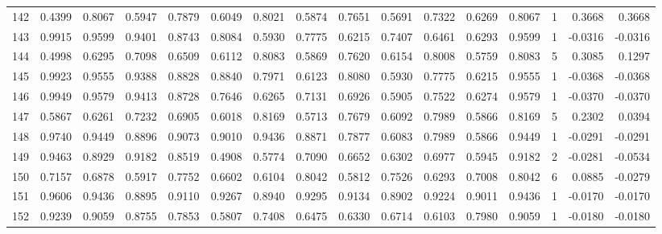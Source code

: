 \begin{tabular}{lrrrrrrrrrrrrrrr}
142 &      0.4399 &  0.8067 &  0.5947 &  0.7879 &  0.6049 &  0.8021 &  0.5874 &  0.7651 &  0.5691 &  0.7322 &   0.6269 &     0.8067 &      1 &                    0.3668 &                     0.3668 \\
143 &      0.9915 &  0.9599 &  0.9401 &  0.8743 &  0.8084 &  0.5930 &  0.7775 &  0.6215 &  0.7407 &  0.6461 &   0.6293 &     0.9599 &      1 &                   -0.0316 &                    -0.0316 \\
144 &      0.4998 &  0.6295 &  0.7098 &  0.6509 &  0.6112 &  0.8083 &  0.5869 &  0.7620 &  0.6154 &  0.8008 &   0.5759 &     0.8083 &      5 &                    0.3085 &                     0.1297 \\
145 &      0.9923 &  0.9555 &  0.9388 &  0.8828 &  0.8840 &  0.7971 &  0.6123 &  0.8080 &  0.5930 &  0.7775 &   0.6215 &     0.9555 &      1 &                   -0.0368 &                    -0.0368 \\
146 &      0.9949 &  0.9579 &  0.9413 &  0.8728 &  0.7646 &  0.6265 &  0.7131 &  0.6926 &  0.5905 &  0.7522 &   0.6274 &     0.9579 &      1 &                   -0.0370 &                    -0.0370 \\
147 &      0.5867 &  0.6261 &  0.7232 &  0.6905 &  0.6018 &  0.8169 &  0.5713 &  0.7679 &  0.6092 &  0.7989 &   0.5866 &     0.8169 &      5 &                    0.2302 &                     0.0394 \\
148 &      0.9740 &  0.9449 &  0.8896 &  0.9073 &  0.9010 &  0.9436 &  0.8871 &  0.7877 &  0.6083 &  0.7989 &   0.5866 &     0.9449 &      1 &                   -0.0291 &                    -0.0291 \\
149 &      0.9463 &  0.8929 &  0.9182 &  0.8519 &  0.4908 &  0.5774 &  0.7090 &  0.6652 &  0.6302 &  0.6977 &   0.5945 &     0.9182 &      2 &                   -0.0281 &                    -0.0534 \\
150 &      0.7157 &  0.6878 &  0.5917 &  0.7752 &  0.6602 &  0.6104 &  0.8042 &  0.5812 &  0.7526 &  0.6293 &   0.7008 &     0.8042 &      6 &                    0.0885 &                    -0.0279 \\
151 &      0.9606 &  0.9436 &  0.8895 &  0.9110 &  0.9267 &  0.8940 &  0.9295 &  0.9134 &  0.8902 &  0.9224 &   0.9011 &     0.9436 &      1 &                   -0.0170 &                    -0.0170 \\
152 &      0.9239 &  0.9059 &  0.8755 &  0.7853 &  0.5807 &  0.7408 &  0.6475 &  0.6330 &  0.6714 &  0.6103 &   0.7980 &     0.9059 &      1 &                   -0.0180 &                    -0.0180 \\

\end{tabular}
